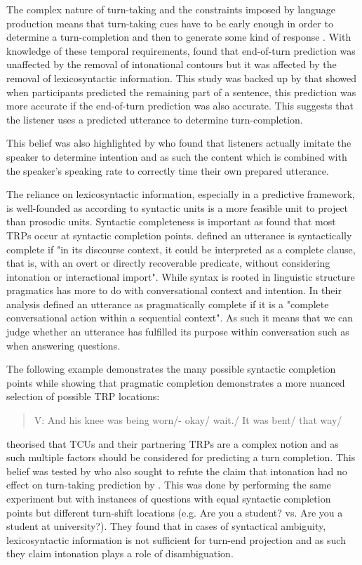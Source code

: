 \documentclass[logo,bsc,singlespacing,parskip]{infthesis}
\begin{document}
The complex nature of turn-taking and the constraints imposed by language production means that turn-taking cues have to be early enough in order to determine a turn-completion and then to generate some kind of response \cite{LevTor2015}. With knowledge of these temporal requirements, \cite{deRuiter2006} found that end-of-turn prediction was unaffected by the removal of intonational contours but it was affected by the removal of lexicosyntactic information. 
This study was backed up by \cite{Magyari2012} that showed when participants predicted the remaining part of a sentence, this prediction was more accurate if the end-of-turn prediction was also accurate. This suggests that the listener uses a predicted utterance to determine turn-completion. 

This belief was also highlighted by \cite{PicGar2013} who found that listeners actually imitate the speaker to determine intention and as such the content which is combined with the speaker's speaking rate to correctly time their own prepared utterance.

The reliance on lexicosyntactic information, especially in a predictive framework, is well-founded as according to \cite{Sacks1974} syntactic units is a more feasible unit to project than prosodic units. 
Syntactic completeness is important as \cite{Ford1996} found that most TRPs occur at syntactic completion points. 
\cite{Ford1996} defined an utterance is syntactically complete if "in its discourse context, it could be interpreted as a complete clause, that is, with an overt or directly recoverable predicate, without considering intonation or interactional import".
While syntax is rooted in linguistic structure pragmatics has more to do with conversational context and intention. 
In their analysis \cite{Ford1996} defined an utterance as pragmatically complete if it is a "complete conversational action within a sequential context".
As such it means that we can judge whether an utterance has fulfilled its purpose within conversation such as when answering questions.

The following example demonstrates the many possible syntactic completion points while showing that pragmatic completion demonstrates a more nuanced selection of possible TRP locations: 
\begin{quote}
    V: And his knee was being worn/- okay/ wait./
    It was bent/ that way/
\end{quote}

\cite{Ford1996} theorised that TCUs and their partnering TRPs are a complex notion and as such multiple factors should be considered for predicting a turn completion. This belief was tested by \cite{BogTor2015} who also sought to refute the claim that intonation had no effect on turn-taking prediction by \cite{deRuiter2006}. This was done by performing the same experiment but with instances of questions with equal syntactic completion points but different turn-shift locations (e.g. Are you a student? vs. Are you a student at university?). They found that in cases of syntactical ambiguity, lexicosyntactic information is not sufficient for turn-end projection and as such they claim intonation plays a role of disambiguation.  
\end{document}
